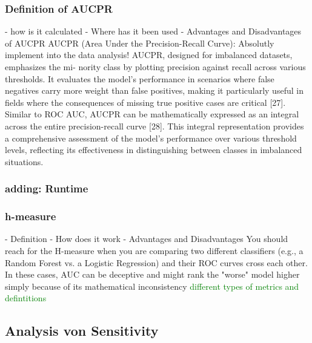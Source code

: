 \subsubsection{Definition of AUCPR}
    - how is it calculated
    - Where has it been used
    - Advantages and Disadvantages of AUCPR
AUCPR (Area Under the Precision-Recall Curve):
Absolutly implement into the data analysis!
AUCPR, designed for imbalanced datasets, emphasizes the mi-
nority class by plotting precision against recall across various
thresholds. It evaluates the model’s performance in scenarios
where false negatives carry more weight than false positives,
making it particularly useful in fields where the consequences
of missing true positive cases are critical [27]. Similar to
ROC AUC, AUCPR can be mathematically expressed as an
integral across the entire precision-recall curve [28]. This
integral representation provides a comprehensive assessment
of the model’s performance over various threshold levels,
reflecting its effectiveness in distinguishing between classes
in imbalanced situations. \citep{ok2024exploring}


\subsubsection{adding: Runtime}


\subsubsection{h-measure}
    - Definition
    - How does it work
    - Advantages and Disadvantages
You should reach for the H-measure when you are comparing two different classifiers (e.g., a Random Forest vs. a Logistic Regression) and their ROC curves cross each other. 
In these cases, AUC can be deceptive and might rank the "worse" model higher simply because of its mathematical inconsistency
\textcolor{green}{different types of metrics and defintitions}


\subsection{Analysis von Sensitivity}
